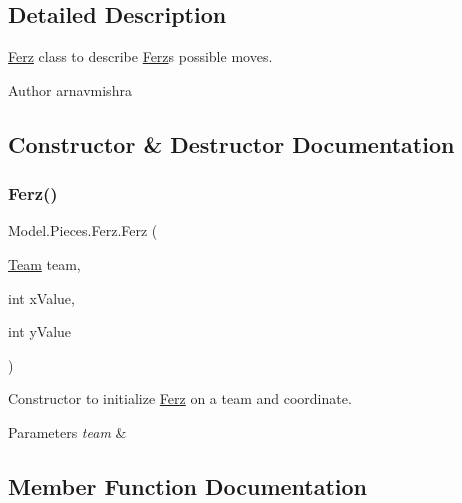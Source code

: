 \subsection{Detailed Description}
\hyperlink{class_model_1_1_pieces_1_1_ferz}{Ferz} class to describe \hyperlink{class_model_1_1_pieces_1_1_ferz}{Ferz}\textquotesingle{}s possible moves. \begin{DoxyAuthor}{Author}
arnavmishra 
\end{DoxyAuthor}


\subsection{Constructor \& Destructor Documentation}
\hypertarget{class_model_1_1_pieces_1_1_ferz_a67c4619c704f514b56bfee13b922ef7b}{}\label{class_model_1_1_pieces_1_1_ferz_a67c4619c704f514b56bfee13b922ef7b} 
\subsubsection{\texorpdfstring{Ferz()}{Ferz()}}
{\footnotesize\ttfamily Model.\+Pieces.\+Ferz.\+Ferz (\begin{DoxyParamCaption}\item[{\hyperlink{class_model_1_1_team}{Team}}]{team,  }\item[{int}]{x\+Value,  }\item[{int}]{y\+Value }\end{DoxyParamCaption})}

Constructor to initialize \hyperlink{class_model_1_1_pieces_1_1_ferz}{Ferz} on a team and coordinate. 
\begin{DoxyParams}{Parameters}
{\em team} & \\
\hline
\end{DoxyParams}


\subsection{Member Function Documentation}
\hypertarget{class_model_1_1_pieces_1_1_ferz_a8359fecbb4158e2e00efcd1561e86177}{}\label{class_model_1_1_pieces_1_1_ferz_a8359fecbb4158e2e00efcd1561e86177} 
